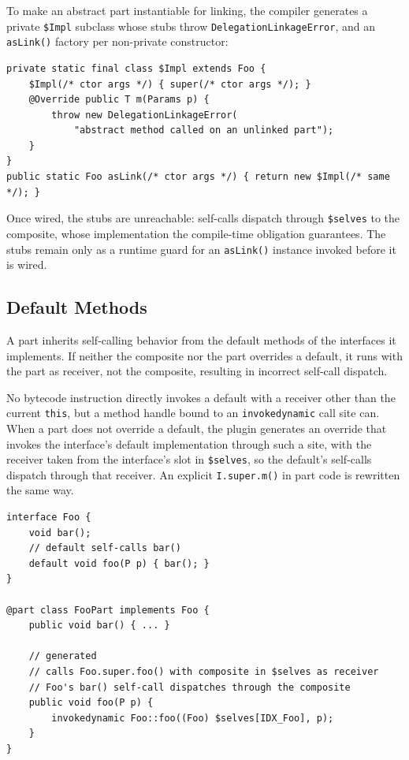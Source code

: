 \documentclass[sigplan,10pt,review,anonymous]{acmart}
\theoremstyle{acmplain}
\newcommand{\code}[1]{\texttt{#1}}
\begin{document}
To make an abstract part instantiable for linking, the compiler generates a
private \code{\$Impl} subclass whose stubs throw \code{DelegationLinkageError},
and an \code{asLink()} factory per non-private constructor:

\begin{lstlisting}
private static final class $Impl extends Foo {
    $Impl(/* ctor args */) { super(/* ctor args */); }
    @Override public T m(Params p) {
        throw new DelegationLinkageError(
            "abstract method called on an unlinked part");
    }
}
public static Foo asLink(/* ctor args */) { return new $Impl(/* same */); }
\end{lstlisting}

Once wired, the stubs are unreachable: self-calls dispatch through
\code{\$selves} to the composite, whose implementation the compile-time
obligation guarantees. The stubs remain only as a runtime guard for an
\code{asLink()} instance invoked before it is wired.

\subsection{Default Methods}
\label{subsec:default}

A part inherits self-calling behavior from the default methods of the
interfaces it implements. If neither the composite nor the part
overrides a default, it runs with the part as receiver, not the
composite, resulting in incorrect self-call dispatch.

No bytecode instruction directly invokes a default with a receiver other
than the current \code{this}, but a method handle bound to an \code{invokedynamic}
call site can. When a part does not override a default, the plugin
generates an override that invokes the interface's default implementation through
such a site, with the receiver taken from the interface's slot in \code{\$selves},
so the default's self-calls dispatch through that receiver. An explicit
\code{I.super.m()} in part code is rewritten the same way.

\begin{lstlisting}
interface Foo {
    void bar();
    // default self-calls bar()
    default void foo(P p) { bar(); }
}

@part class FooPart implements Foo {
    public void bar() { ... }

    // generated
    // calls Foo.super.foo() with composite in $selves as receiver
    // Foo's bar() self-call dispatches through the composite
    public void foo(P p) {
        invokedynamic Foo::foo((Foo) $selves[IDX_Foo], p);
    }
}
\end{lstlisting}
\end{document}
